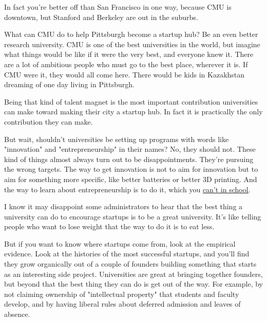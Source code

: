 In fact you're
                  better off than San Francisco in one way, because CMU is
                  downtown, but Stanford and Berkeley are out in the suburbs.

What
                  can CMU do to help Pittsburgh become a startup hub? Be an even
                  better research university. CMU is one of the best
                  universities in the world, but imagine what things would be
                  like if it were the very best, and everyone knew it. There are
                  a lot of ambitious people who must go to the best place,
                  wherever it is. If CMU were it, they would all come here.
                  There would be kids in Kazakhstan dreaming of one day living
                  in Pittsburgh.

Being that kind of talent magnet is
                  the most important contribution universities can make toward
                  making their city a startup hub. In fact it is practically the
                  only contribution they can make.

But wait,
                  shouldn't universities be setting up programs with words like
                  "innovation" and "entrepreneurship" in their names? No, they
                  should not. These kind of things almost always turn out to be
                  disappointments. They're pursuing the wrong targets. The way
                  to get innovation is not to aim for innovation but to aim for
                  something more specific, like better batteries or better 3D
                  printing. And the way to learn about entrepreneurship is to do
                  it, which you \href{http://www.paulgraham.com/before.html}{\underline{can't in school}}.

I know it may disappoint some administrators to
                  hear that the best thing a university can do to encourage
                  startups is to be a great university. It's like telling people
                  who want to lose weight that the way to do it is to eat
                  less.

But if you want to know where startups come
                  from, look at the empirical evidence. Look at the histories of
                  the most successful startups, and you'll find they grow
                  organically out of a couple of founders building something
                  that starts as an interesting side project. Universities are
                  great at bringing together founders, but beyond that the best
                  thing they can do is get out of the way. For example, by not
                  claiming ownership of "intellectual property" that students
                  and faculty develop, and by having liberal rules about
                  deferred admission and leaves of absence.

